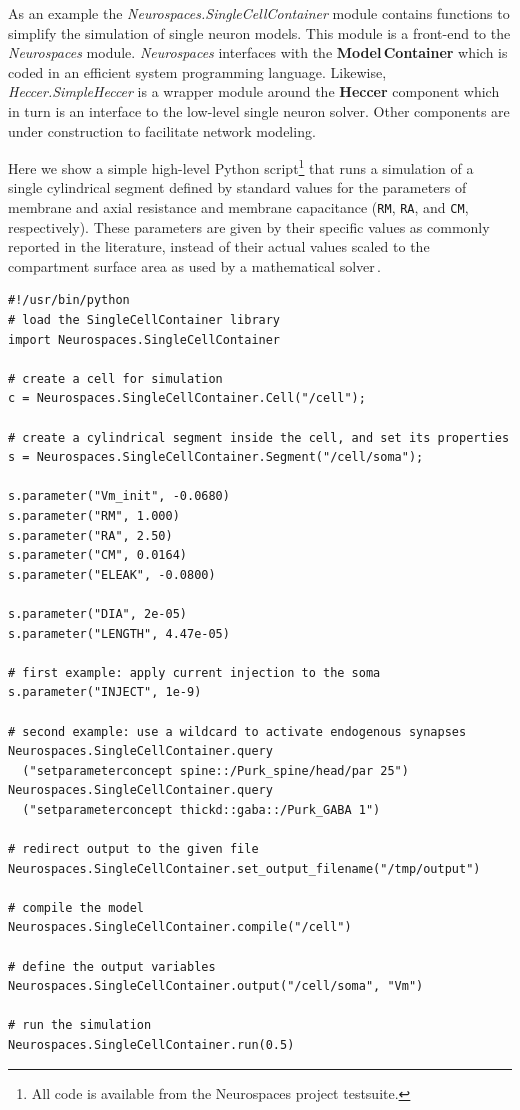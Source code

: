 \documentclass[12pt]{article}
\begin{document}
As an example the {\it Neurospaces.SingleCellContainer} module
contains functions to simplify the simulation of single neuron models.
This module is a front-end to the {\it Neurospaces} module.  {\it
  Neurospaces} interfaces with the {\bf Model\,Container} which is coded in
an efficient system programming language.  Likewise, {\it
  Heccer.SimpleHeccer} is a wrapper module around the {\bf Heccer}
component which in turn is an interface to the low-level single neuron
solver.  Other components are under construction to facilitate network
modeling.

Here we show a simple high-level Python script\footnote{All code is
  available from the Neurospaces project testsuite.} that runs a
simulation of a single cylindrical segment defined by standard values
for the parameters of membrane and axial resistance and membrane
capacitance ({\tt RM}, {\tt RA},
and {\tt CM}, respectively).  These parameters are given by their
specific values as commonly reported in the literature, instead of
their actual values scaled to the compartment surface area as used by
a mathematical solver\,\cite{cornelis04:_neuros_param_handl}.

{\vspace*{1mm}
 { \footnotesize
  \linenumbers
  {\begin{verbatim}
#!/usr/bin/python
# load the SingleCellContainer library
import Neurospaces.SingleCellContainer

# create a cell for simulation
c = Neurospaces.SingleCellContainer.Cell("/cell");

# create a cylindrical segment inside the cell, and set its properties
s = Neurospaces.SingleCellContainer.Segment("/cell/soma");

s.parameter("Vm_init", -0.0680)
s.parameter("RM", 1.000)
s.parameter("RA", 2.50)
s.parameter("CM", 0.0164)
s.parameter("ELEAK", -0.0800)

s.parameter("DIA", 2e-05)
s.parameter("LENGTH", 4.47e-05)

# first example: apply current injection to the soma
s.parameter("INJECT", 1e-9)

# second example: use a wildcard to activate endogenous synapses
Neurospaces.SingleCellContainer.query
  ("setparameterconcept spine::/Purk_spine/head/par 25")
Neurospaces.SingleCellContainer.query
  ("setparameterconcept thickd::gaba::/Purk_GABA 1")

# redirect output to the given file
Neurospaces.SingleCellContainer.set_output_filename("/tmp/output")

# compile the model
Neurospaces.SingleCellContainer.compile("/cell")

# define the output variables
Neurospaces.SingleCellContainer.output("/cell/soma", "Vm")
    
# run the simulation
Neurospaces.SingleCellContainer.run(0.5)
\end{verbatim}
  \vspace*{1mm} }}}
\end{document}
